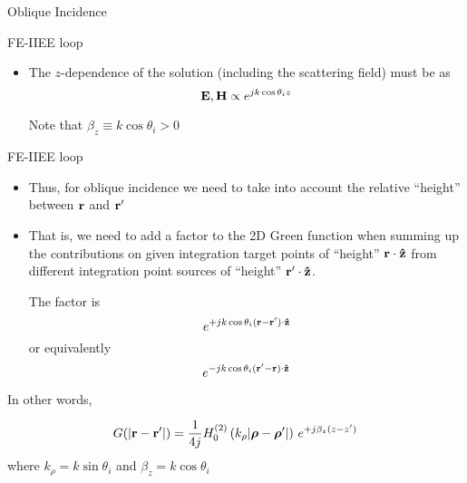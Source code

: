 \begin{frame}[allowframebreaks]{Oblique Incidence}
\begin{block}{FE-IIEE loop}
\begin{itemize}
      \item The $z$-dependence of the solution (including the scattering field) must be as
        \begin{equation*}
          \vE,\vH \propto   e^{j k \cos\theta_i z} %
        \end{equation*}

        Note that $\beta_z\equiv k\cos\theta_i>0$%
        
      \end{itemize}
    \end{block}

        
    \begin{block}{FE-IIEE loop \insertcontinuationtext}
      \begin{itemize}
      \item Thus, for oblique incidence we need to take into account
        the relative ``height'' between $\mathbf{r}$ and $\mathbf{r^\prime}$

      \item That is, we need to add a factor to the 2D Green function
        when summing up the contributions on given integration target
        points of ``height'' $\mathbf{r}\cdot\mathbf{\hat{z}}$ from different
        integration point sources of ``height'' $\mathbf{r^\prime}\cdot\mathbf{\hat{z}}$.

        \vbss
        
        The factor is
        \begin{equation*}
          e^{+j k \cos\theta_i (\mathbf{r}-\mathbf{r^\prime})\cdot\mathbf{\hat{z}}}
        \end{equation*}
        or equivalently 
        \begin{equation*}
          e^{-j k \cos\theta_i (\mathbf{r^\prime}-\mathbf{r})\cdot\mathbf{\hat{z}}}
        \end{equation*}
        
      \end{itemize}
    \end{block}

    \newpage 
    
    \begin{block}{In other words,}
      
      \begin{equation*}
        G(|\mathbf{r}-\mathbf{r^\prime}|) = \dfrac{1}{4j}
        H_0^{(2)}\left( k_\rho|\boldsymbol{\rho}-\boldsymbol{\rho}^\prime|\right) \,
        e^{+j \beta_z (z-z^\prime)}
      \end{equation*}
      where $k_\rho=k\sin\theta_i$ and $\beta_z=k\cos\theta_i$


\end{block}
\end{frame}
